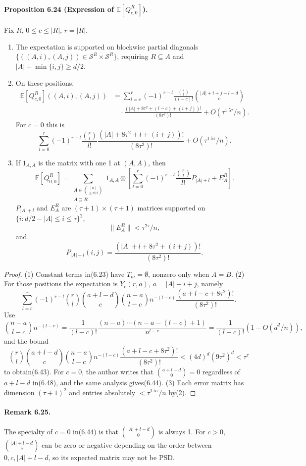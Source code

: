 \paragraph{Proposition 6.24 (Expression of $\mathbb E[Q_{c,0}^R]$).} Fix $R$, $0\le c\le|R|$, $r=|R|$.
\begin{enumerate}\item The expectation is supported on blockwise partial diagonals $\{((A,i),(A,j))\in\mathcal S^R\times\mathcal S^R\}$, requiring $R\subseteq A$ and $|A|+\min\{i,j\}\ge d/2$.
\item On these positions,
\begin{align*}\mathbb E[Q_{c,0}^R]((A,i),(A,j))&=\sum_{l=c}^r(-1)^{r-l}\frac{\binom rl}{(l-c)!}\binom{|A|+i+j+l-d}c\\&\quad\cdot\frac{(|A|+8\tau^2+(l-c)+(i+j))!}{(8\tau^2)!}+O(\tau^{1.5\tau}/n).\tag{6.43}\end{align*}
For $c=0$ this is
\[\sum_{l=0}^r(-1)^{r-l}\frac{\binom rl}{l!}\frac{(|A|+8\tau^2+l+(i+j))!}{(8\tau^2)!}+O(\tau^{1.5\tau}/n).\tag{6.44}\]
\item If $1_{A,A}$ is the matrix with one 1 at $(A,A)$, then
\[\mathbb E[Q_{0,0}^R]=\sum_{\substack{A\in\binom{[n]}{\le d/2}\\A\supseteq R}}1_{A,A}\otimes\left[\sum_{l=0}^r(-1)^{r-l}\frac{\binom rl}{l!}P_{|A|+l}+E_A^R\right].\tag{6.45}\]
$P_{|A|+l}$ and $E_A^R$ are $(\tau+1)\times(\tau+1)$ matrices supported on $\{i:d/2-|A|\le i\le\tau\}^2$,
\[\|E_A^R\|<\tau^{2\tau}/n,\tag{6.46}\]
and
\[P_{|A|+l}(i,j)=\frac{(|A|+l+8\tau^2+(i+j))!}{(8\tau^2)!}.\tag{6.47}\]
\end{enumerate}
\begin{proof}(1) Constant terms in(6.23) have $T_m=\emptyset$, nonzero only when $A=B$. (2) For those positions the expectation is $Y_c(r,a)$, $a=|A|+i+j$, namely
\[\sum_{l=c}^r(-1)^{r-l}\binom rl\binom{a+l-d}c\binom{n-a}{l-c}n^{-(l-c)}\frac{(a+l-c+8\tau^2)!}{(8\tau^2)!}.\tag{6.48}\]
Use
\[\binom{n-a}{l-c}n^{-(l-c)}=\frac1{(l-c)!}\frac{(n-a)\cdots(n-a-(l-c)+1)}{n^{l-c}}=\frac1{(l-c)!}(1-O(d^2/n)),\]
and the bound
\[\binom rl\binom{a+l-d}c\binom{n-a}{l-c}n^{-(l-c)}\frac{(a+l-c+8\tau^2)!}{(8\tau^2)!}<(4d)^d(9\tau^2)^d<\tau^\tau\]
to obtain(6.43). For $c=0$, the author writes that $\binom{a+l-d}0=0$ regardless of $a+l-d$ in(6.48), and the same analysis gives(6.44). (3) Each error matrix has dimension $(\tau+1)^2$ and entries absolutely $<\tau^{1.5\tau}/n$ by(2).\end{proof}
\paragraph{Remark 6.25.} The specialty of $c=0$ in(6.44) is that $\binom{|A|+l-d}0$ is always 1. For $c>0$, $\binom{|A|+l-d}c$ can be zero or negative depending on the order between $0,c,|A|+l-d$, so its expected matrix may not be PSD.
